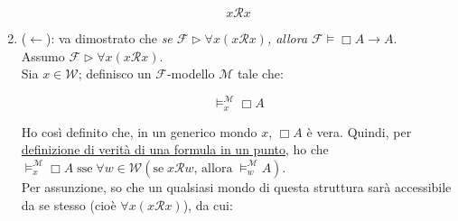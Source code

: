 \documentclass[a4paper,12pt]{article}
\begin{document}
\begin{dimo}
\begin{enumerate}
		\begin{minipage}{0.48\textwidth}
			$$x\mathcal{R}x$$
		\end{minipage}
		\begin{minipage}{0.48\textwidth}
			\begin{center}
			\end{center}
		\end{minipage}
		\vspace{8pt}
		
		\item ($\leftarrow$): va dimostrato che \emph{se $\mathcal{F} \rhd \forall x (x\mathcal{R}x)$, allora $ \mathcal{F} \vDash \Box A \to A$}. \\
		Assumo $\mathcal{F} \rhd \forall x (x\mathcal{R}x)$. \\
		Sia $x \in \mathcal{W}$; definisco un $\mathcal{F}$-modello $\mathcal{M}$ tale che: \\
		
		\begin{minipage}{0.48\textwidth}
			$$\vDash_x^{\mathcal{M}}\Box A$$
		\end{minipage}
		\begin{minipage}{0.48\textwidth}
			\begin{center}
			\end{center}
		\end{minipage}
		\vspace{8pt}
		
		Ho così definito che, in un generico mondo $x$, $\Box A$ è vera. Quindi, per \hyperlink{defverp}{definizione di verità di una formula in un punto}, ho che $\vDash_x^{\mathcal{M}} \Box A \; \text{sse} \; \forall w \in \mathcal{W} (\text{se} \; x\mathcal{R}w  \text{, allora} \; \vDash_w^{\mathcal{M}} A)$. \\
		Per assunzione, so che un qualsiasi mondo di questa struttura sarà accessibile da se stesso (cioè $\forall x (x\mathcal{R}x)$), da cui:
		\vspace{0pt}
			

\end{enumerate}
\end{dimo}
\end{document}
